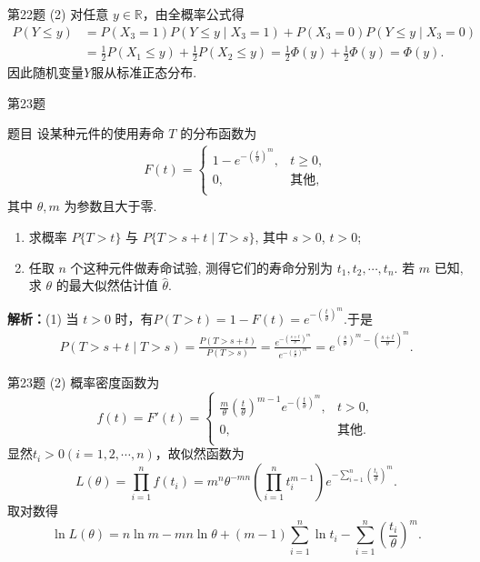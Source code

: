 \documentclass[aspectratio=169]{beamer}
\begin{document}
\begin{frame}{第22题}
(2) 对任意 $y\in\mathbb R$，由全概率公式得
\begin{align*}
P\left( Y\leqslant y \right) &=P\left( X_3=1 \right) P\left( Y\leqslant y\mid X_3=1 \right) +P\left( X_3=0 \right) P\left( Y\leqslant y\mid X_3=0 \right) 
\\
&=\frac{1}{2}P\left( X_1\leqslant y \right) +\frac{1}{2}P\left( X_2\leqslant y \right) =\frac{1}{2}\Phi (y)+\frac{1}{2}\Phi (y)=\Phi (y).
\end{align*}
因此随机变量$Y$服从标准正态分布.
\end{frame}

\begin{frame}{第23题}
\begin{block}{题目}
设某种元件的使用寿命 $T$ 的分布函数为
\begin{align*}
F(t)=\begin{cases}
1-e^{-\left( \frac{t}{\theta} \right) ^m},&		t\geqslant 0,\\
0,&		\text{其他},\\
\end{cases}
\end{align*}
其中 $\theta, m$ 为参数且大于零.
\begin{enumerate}[(1)]
\item 求概率 $P\{T>t\}$ 与 $P\{T>s+t \mid T>s\}$, 其中 $s>0$, $t>0$;
\item 任取 $n$ 个这种元件做寿命试验, 测得它们的寿命分别为 $t_1, t_2, \cdots, t_n$. 若 $m$ 已知, 求 $\theta$ 的最大似然估计值 $\hat{\theta}$.
\end{enumerate}
\end{block}
\textbf{解析：}(1) 当 $t>0$ 时，有$P(T>t)=1-F(t)=e^{-\left(\frac{t}{\theta}\right)^m}.$于是
\begin{align*}
P\left( T>s+t\mid T>s \right) =\frac{P\left( T>s+t \right)}{P\left( T>s \right)}=\frac{e^{-\left( \frac{s+t}{\theta} \right) ^m}}{e^{-\left( \frac{s}{\theta} \right) ^m}}=e^{\left( \frac{s}{\theta} \right) ^m-\left( \frac{s+t}{\theta} \right) ^m}.
\end{align*}
\end{frame}

\begin{frame}{第23题}
(2) 概率密度函数为
\[
f(t)=F'(t)=\begin{cases}
\frac{m}{\theta}\left( \frac{t}{\theta} \right) ^{m-1}e^{-\left( \frac{t}{\theta} \right) ^m},&t>0,\\
0,&\text{其他}.\\
\end{cases}
\]
显然$t_i>0(i=1,2,\cdots,n)$，故似然函数为
\[
L(\theta )=\prod_{i=1}^n{f(t_i)}=m^n\theta ^{-mn}\left( \prod_{i=1}^n{t_{i}^{m-1}} \right) e^{-\sum\limits_{i=1}^n{\left( \frac{t_i}{\theta} \right) ^m}}.
\]
取对数得
\[
\ln L(\theta)
=n\ln m-mn\ln\theta+(m-1)\sum_{i=1}^n\ln t_i
-\sum_{i=1}^n\left(\frac{t_i}{\theta}\right)^m.
\]
\end{frame}
\end{document}
